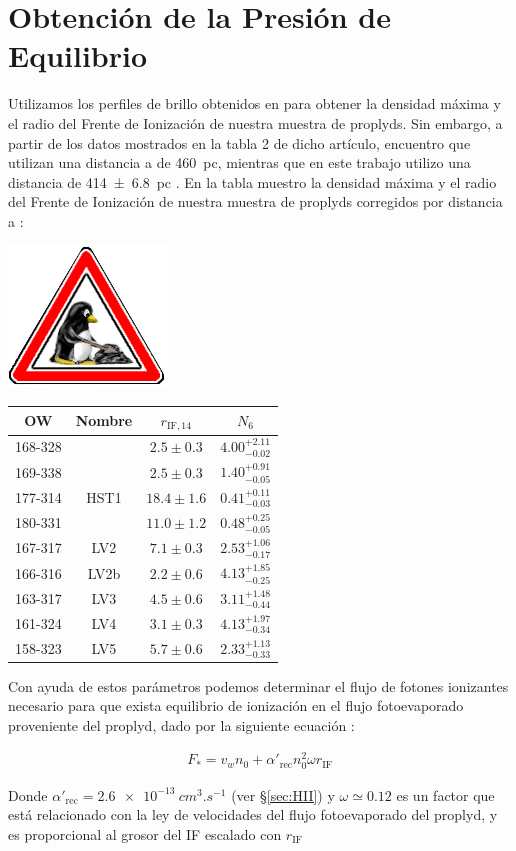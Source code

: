 \section{Obtención de la Presión de Equilibrio}

Utilizamos los perfiles de brillo obtenidos en \citet{HA:1998} para obtener la densidad máxima y el radio del Frente de Ionización de nuestra muestra de proplyds. Sin embargo, a partir de los datos mostrados en la tabla 2 de dicho artículo, encuentro que utilizan una distancia a \thC{} de \SI{460}{pc}, mientras que en este trabajo utilizo una distancia de \SI{414\pm 6.8}{pc} \citep{Menten:2007}. En la tabla  muestro la densidad máxima y el radio del Frente de Ionización de nuestra muestra de proplyds corregidos por distancia a \thC{}:

\includegraphics[width=0.1\linewidth]{./Figures/tux-development}
\begin{table}
  \begin{tabular}{cccc} \toprule
    OW      & Nombre & $r_{\mathrm{IF}, 14}$     & $N_6$ \\
    \midrule
    168-328 &        & $2.5 \pm 0.3$  & $4.00^{+2.11}_{-0.02}$ \\
    169-338 &        & $2.5 \pm 0.3$  & $1.40^{+0.91}_{-0.05}$ \\
    177-314 & HST1   & $18.4 \pm 1.6$ & $0.41^{+0.11}_{-0.03}$ \\ 
    180-331 &        & $11.0 \pm 1.2$ & $0.48^{+0.25}_{-0.05}$ \\
    167-317 & LV2    & $7.1 \pm 0.3$  & $2.53^{+1.06}_{-0.17}$ \\
    166-316 & LV2b   & $2.2 \pm 0.6$  & $4.13^{+1.85}_{-0.25}$ \\
    163-317 & LV3    & $4.5 \pm 0.6$  & $3.11^{+1.48}_{-0.44}$ \\
    161-324 & LV4    & $3.1 \pm 0.3$  & $4.13^{+1.97}_{-0.34}$ \\
    158-323 & LV5    & $5.7 \pm 0.6$  & $2.33^{+1.13}_{-0.33}$ \\
  \bottomrule
  \end{tabular}
  
\end{table}

Con ayuda de estos parámetros podemos determinar el flujo de fotones ionizantes necesario para que exista equilibrio de ionización en el flujo fotoevaporado proveniente del proplyd, dado por la siguiente ecuación \citep{Henney:2001}:

\begin{align}
  F_* = v_w n_0 + \alpha'_{\mathrm{rec}}n^2_0 \omega r_{\mathrm{IF}}
\end{align}

Donde $\alpha'_{\mathrm{rec}} = \SI{2.6e-13}{cm^3.s^{-1}}$ (ver \S \ref{sec:HII}) y $\omega \simeq 0.12$ es un factor que está relacionado con la ley de velocidades del flujo fotoevaporado del proplyd, y es proporcional al grosor del IF escalado con $r_{\mathrm{IF}}$